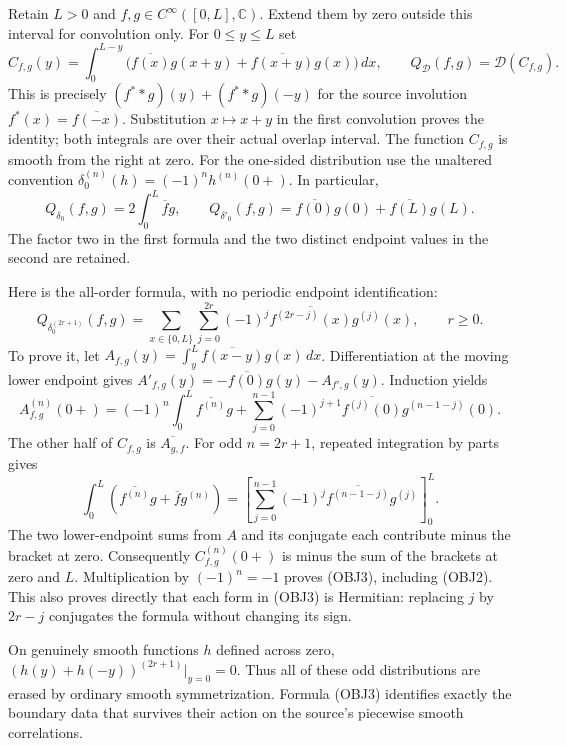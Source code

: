Retain $L>0$ and $f,g\in C^\infty([0,L],\mathbb C)$. Extend them by zero
outside this interval for convolution only. For $0\le y\le L$ set
\begin{equation}\tag{OBJ1}
 C_{f,g}(y)=\int_0^{L-y}
 \bigl(\overline{f(x)}g(x+y)+\overline{f(x+y)}g(x)\bigr)\,dx,
 \qquad Q_{\mathcal D}(f,g)=\mathcal D(C_{f,g}).
\end{equation}
This is precisely $(f^**g)(y)+(f^**g)(-y)$ for the source involution
$f^*(x)=\overline{f(-x)}$. Substitution $x\mapsto x+y$ in the first
convolution proves the identity; both integrals are over their actual
overlap interval. The function $C_{f,g}$ is smooth from the right at zero.
For the one-sided distribution use the unaltered convention
$\delta_0^{(n)}(h)=(-1)^n h^{(n)}(0+)$. In particular,
\begin{equation}\tag{OBJ2}
 Q_{\delta_0}(f,g)=2\int_0^L\overline f g,\qquad
 Q_{\delta'_0}(f,g)=\overline{f(0)}g(0)+\overline{f(L)}g(L).
\end{equation}
The factor two in the first formula and the two distinct endpoint
values in the second are retained.

Here is the all-order formula, with no periodic endpoint identification:
\begin{equation}\tag{OBJ3}
 Q_{\delta_0^{(2r+1)}}(f,g)
 =\sum_{x\in\{0,L\}}\sum_{j=0}^{2r}(-1)^j
       \overline{f^{(2r-j)}(x)}g^{(j)}(x),\qquad r\ge0.
\end{equation}
To prove it, let
$A_{f,g}(y)=\int_y^L\overline{f(x-y)}g(x)\,dx$. Differentiation at the
moving lower endpoint gives
$A'_{f,g}(y)=-\overline{f(0)}g(y)-A_{f',g}(y)$. Induction yields
\[
 A_{f,g}^{(n)}(0+)=(-1)^n\int_0^L\overline{f^{(n)}}g
 +\sum_{j=0}^{n-1}(-1)^{j+1}\overline{f^{(j)}(0)}g^{(n-1-j)}(0).
\]
The other half of $C_{f,g}$ is $\overline{A_{g,f}}$. For odd
$n=2r+1$, repeated integration by parts gives
\[
 \int_0^L(\overline{f^{(n)}}g+\overline f g^{(n)})
 =\left[\sum_{j=0}^{n-1}(-1)^j
       \overline{f^{(n-1-j)}}g^{(j)}\right]_0^L.
\]
The two lower-endpoint sums from $A$ and its conjugate each contribute
minus the bracket at zero. Consequently $C_{f,g}^{(n)}(0+)$ is minus
the sum of the brackets at zero and $L$. Multiplication by $(-1)^n=-1$
proves (OBJ3), including (OBJ2). This also proves directly that each
form in (OBJ3) is Hermitian: replacing $j$ by $2r-j$ conjugates the
formula without changing its sign.

On genuinely smooth functions $h$ defined across zero,
$(h(y)+h(-y))^{(2r+1)}|_{y=0}=0$. Thus all of these odd distributions
are erased by ordinary smooth symmetrization. Formula (OBJ3)
identifies exactly the boundary data that survives their action on
the source's piecewise smooth correlations.

